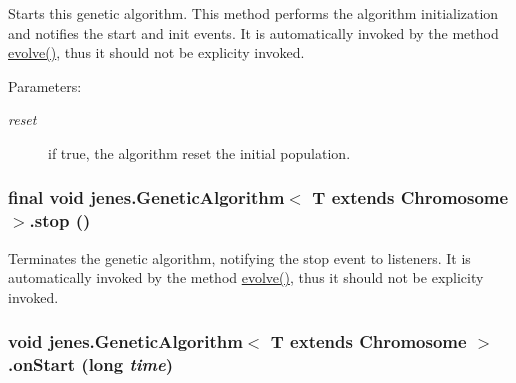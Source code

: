 Starts this genetic algorithm. This method performs the algorithm initialization and notifies the start and init events. It is automatically invoked by the method \hyperlink{classjenes_1_1_genetic_algorithm_3_01_t_01extends_01_chromosome_01_4_8afdd855dc891b981cbf675c63db72c3}{evolve()}, thus it should not be explicity invoked.

\begin{Desc}
\item[Parameters:]
\begin{description}
\item[{\em reset}]if true, the algorithm reset the initial population. \end{description}
\end{Desc}
\hypertarget{classjenes_1_1_genetic_algorithm_3_01_t_01extends_01_chromosome_01_4_6d0de9962bff7d63a4c197eeef6da7d0}{
\subsubsection[stop]{\setlength{\rightskip}{0pt plus 5cm}final void jenes.GeneticAlgorithm$<$ T extends Chromosome $>$.stop ()}}
\label{classjenes_1_1_genetic_algorithm_3_01_t_01extends_01_chromosome_01_4_6d0de9962bff7d63a4c197eeef6da7d0}


Terminates the genetic algorithm, notifying the stop event to listeners. It is automatically invoked by the method \hyperlink{classjenes_1_1_genetic_algorithm_3_01_t_01extends_01_chromosome_01_4_8afdd855dc891b981cbf675c63db72c3}{evolve()}, thus it should not be explicity invoked. \hypertarget{classjenes_1_1_genetic_algorithm_3_01_t_01extends_01_chromosome_01_4_0ed4a97cf7e3266913eaad8092913de3}{
\subsubsection[onStart]{\setlength{\rightskip}{0pt plus 5cm}void jenes.GeneticAlgorithm$<$ T extends Chromosome $>$.onStart (long {\em time})}}
\label{classjenes_1_1_genetic_algorithm_3_01_t_01extends_01_chromosome_01_4_0ed4a97cf7e3266913eaad8092913de3}


